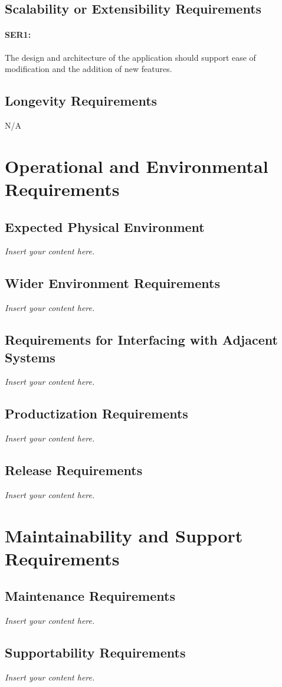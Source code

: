 \documentclass[12pt]{article}
\newcommand{\lips}{\textit{Insert your content here.}}
\begin{document}
\subsection{Scalability or Extensibility Requirements}
\paragraph{SER1:} The design and architecture of the application should support ease of modification and the addition of new features.


\subsection{Longevity Requirements}
N/A



\section{Operational and Environmental Requirements}
\subsection{Expected Physical Environment}
\lips
\subsection{Wider Environment Requirements}
\lips
\subsection{Requirements for Interfacing with Adjacent Systems}
\lips
\subsection{Productization Requirements}
\lips
\subsection{Release Requirements}
\lips

\section{Maintainability and Support Requirements}
\subsection{Maintenance Requirements}
\lips
\subsection{Supportability Requirements}
\lips
\end{document}
